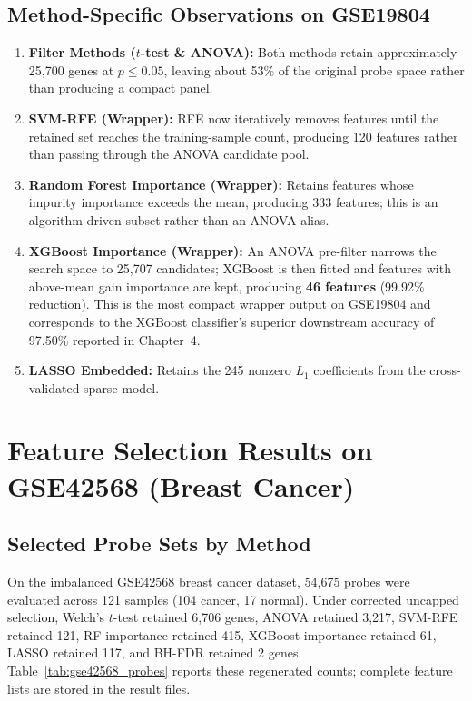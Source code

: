 \subsection{Method-Specific Observations on GSE19804}

\begin{enumerate}
    \item \textbf{Filter Methods ($t$-test \& ANOVA):} Both methods retain approximately 25,700 genes at $p \leq 0.05$, leaving about 53\% of the original probe space rather than producing a compact panel.

    \item \textbf{SVM-RFE (Wrapper):} RFE now iteratively removes features until the retained set reaches the training-sample count, producing 120 features rather than passing through the ANOVA candidate pool.

    \item \textbf{Random Forest Importance (Wrapper):} Retains features whose impurity importance exceeds the mean, producing 333 features; this is an algorithm-driven subset rather than an ANOVA alias.

    \item \textbf{XGBoost Importance (Wrapper):} An ANOVA pre-filter narrows the search space to 25,707 candidates; XGBoost is then fitted and features with above-mean gain importance are kept, producing \textbf{46 features} (99.92\% reduction). This is the most compact wrapper output on GSE19804 and corresponds to the XGBoost classifier's superior downstream accuracy of 97.50\% reported in Chapter~4.

    \item \textbf{LASSO Embedded:} Retains the 245 nonzero $L_1$ coefficients from the cross-validated sparse model.
\end{enumerate}

\section{Feature Selection Results on GSE42568 (Breast Cancer)}

\subsection{Selected Probe Sets by Method}

On the imbalanced GSE42568 breast cancer dataset, 54,675 probes were evaluated across 121 samples (104 cancer, 17 normal). Under corrected uncapped selection, Welch's $t$-test retained 6,706 genes, ANOVA retained 3,217, SVM-RFE retained 121, RF importance retained 415, XGBoost importance retained 61, LASSO retained 117, and BH-FDR retained 2 genes. Table~\ref{tab:gse42568_probes} reports these regenerated counts; complete feature lists are stored in the result files.

